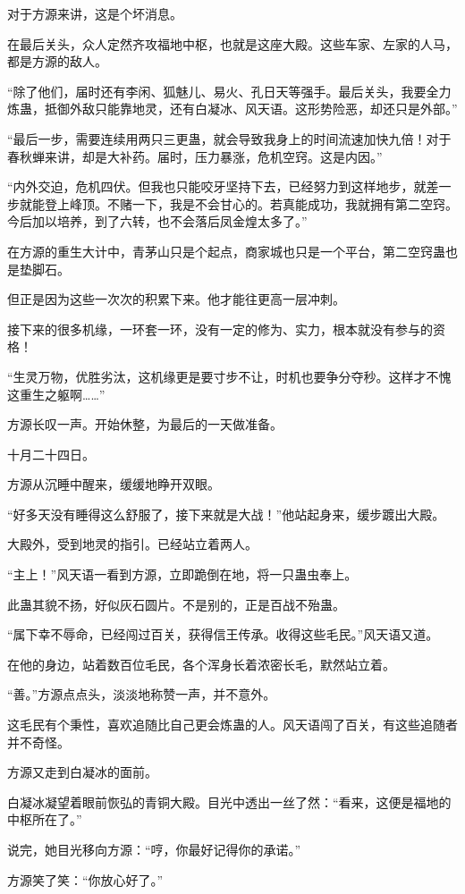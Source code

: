 \begin{this_body}
对于方源来讲，这是个坏消息。

在最后关头，众人定然齐攻福地中枢，也就是这座大殿。这些车家、左家的人马，都是方源的敌人。

“除了他们，届时还有李闲、狐魅儿、易火、孔日天等强手。最后关头，我要全力炼蛊，抵御外敌只能靠地灵，还有白凝冰、风天语。这形势险恶，却还只是外部。”

“最后一步，需要连续用两只三更蛊，就会导致我身上的时间流速加快九倍！对于春秋蝉来讲，却是大补药。届时，压力暴涨，危机空窍。这是内因。”

“内外交迫，危机四伏。但我也只能咬牙坚持下去，已经努力到这样地步，就差一步就能登上峰顶。不赌一下，我是不会甘心的。若真能成功，我就拥有第二空窍。今后加以培养，到了六转，也不会落后凤金煌太多了。”

在方源的重生大计中，青茅山只是个起点，商家城也只是一个平台，第二空窍蛊也是垫脚石。

但正是因为这些一次次的积累下来。他才能往更高一层冲刺。

接下来的很多机缘，一环套一环，没有一定的修为、实力，根本就没有参与的资格！

“生灵万物，优胜劣汰，这机缘更是要寸步不让，时机也要争分夺秒。这样才不愧这重生之躯啊……”

方源长叹一声。开始休整，为最后的一天做准备。

十月二十四日。

方源从沉睡中醒来，缓缓地睁开双眼。

“好多天没有睡得这么舒服了，接下来就是大战！”他站起身来，缓步踱出大殿。

大殿外，受到地灵的指引。已经站立着两人。

“主上！”风天语一看到方源，立即跪倒在地，将一只蛊虫奉上。

此蛊其貌不扬，好似灰石圆片。不是别的，正是百战不殆蛊。

“属下幸不辱命，已经闯过百关，获得信王传承。收得这些毛民。”风天语又道。

在他的身边，站着数百位毛民，各个浑身长着浓密长毛，默然站立着。

“善。”方源点点头，淡淡地称赞一声，并不意外。

这毛民有个秉性，喜欢追随比自己更会炼蛊的人。风天语闯了百关，有这些追随者并不奇怪。

方源又走到白凝冰的面前。

白凝冰凝望着眼前恢弘的青铜大殿。目光中透出一丝了然：“看来，这便是福地的中枢所在了。”

说完，她目光移向方源：“哼，你最好记得你的承诺。”

方源笑了笑：“你放心好了。”


\end{this_body}
